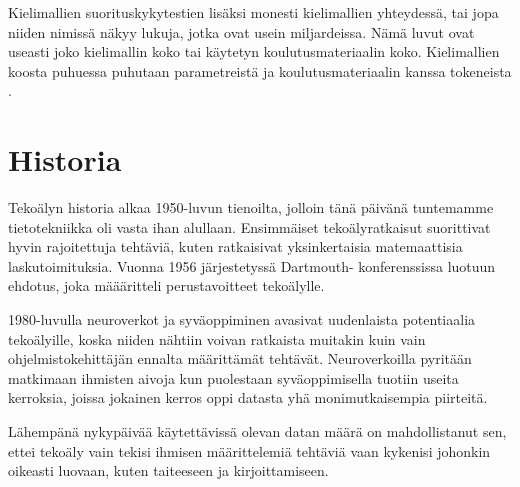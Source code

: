 Kielimallien suorituskykytestien lisäksi monesti kielimallien yhteydessä, tai
jopa niiden nimissä näkyy lukuja, jotka ovat usein miljardeissa. Nämä luvut
ovat useasti joko kielimallin koko tai käytetyn koulutusmateriaalin koko.
Kielimallien koosta puhuessa puhutaan parametreistä ja koulutusmateriaalin
kanssa tokeneista \parencite{kaplan2020scalinglawsneurallanguage}.

\section{Historia}

Tekoälyn historia alkaa 1950-luvun tienoilta, jolloin tänä päivänä tuntemamme
tietotekniikka oli vasta ihan alullaan. Ensimmäiset tekoälyratkaisut
suorittivat hyvin rajoitettuja tehtäviä, kuten ratkaisivat yksinkertaisia
matemaattisia laskutoimituksia. Vuonna 1956 järjestetyssä Dartmouth-
konferenssissa luotuun ehdotus, joka määäritteli perustavoitteet tekoälylle.
\parencite{alma9911564814005973}

1980-luvulla neuroverkot ja syväoppiminen avasivat uudenlaista potentiaalia
tekoälyille, koska niiden nähtiin voivan ratkaista muitakin kuin vain
ohjelmistokehittäjän ennalta määrittämät tehtävät. Neuroverkoilla pyritään
matkimaan ihmisten aivoja kun puolestaan syväoppimisella tuotiin useita
kerroksia, joissa jokainen kerros oppi datasta yhä monimutkaisempia piirteitä.
\parencite{alma9911564814005973}

Lähempänä nykypäivää käytettävissä olevan datan määrä on mahdollistanut sen,
ettei tekoäly vain tekisi ihmisen määrittelemiä tehtäviä vaan kykenisi johonkin
oikeasti luovaan, kuten taiteeseen ja kirjoittamiseen.
\parencite{alma9911564814005973}
